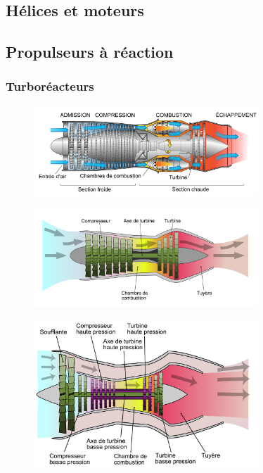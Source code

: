	\subsection{Hélices et moteurs}
	
	\subsection{Propulseurs à réaction}
		\subsubsection{Turboréacteurs}
		\begin{figure}[H]
  		\centering
    		\includegraphics[width=0.75\textwidth]{01-EtudeAeronefs/img/turbomachines/turboreacteur-schema.pdf}
		\end{figure}			
		
		
		\begin{figure}[H]
  		\centering
    		\includegraphics[width=0.75\textwidth]{01-EtudeAeronefs/img/turbomachines/turboreacteur-simpleFlux.pdf}
		\end{figure}	
	
		\begin{figure}[H]
  		\centering
    		\includegraphics[width=0.75\textwidth]{01-EtudeAeronefs/img/turbomachines/turboreacteur-doubeFlux.pdf}
		\end{figure}	
	
